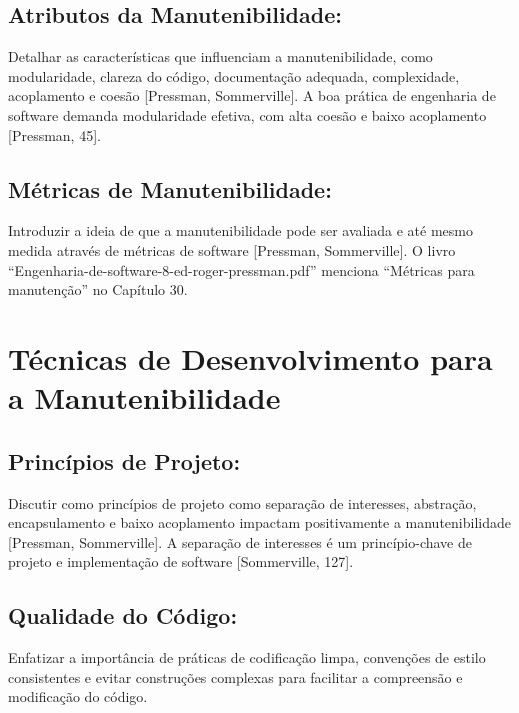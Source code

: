 \documentclass[
]{book}
\begin{document}
\subsection{Atributos da Manutenibilidade:}\label{atributos-da-manutenibilidade}

Detalhar as características que influenciam a manutenibilidade, como modularidade, clareza do código, documentação adequada, complexidade, acoplamento e coesão {[}Pressman, Sommerville{]}. A boa prática de engenharia de software demanda modularidade efetiva, com alta coesão e baixo acoplamento {[}Pressman, 45{]}.

\subsection{Métricas de Manutenibilidade:}\label{muxe9tricas-de-manutenibilidade}

Introduzir a ideia de que a manutenibilidade pode ser avaliada e até mesmo medida através de métricas de software {[}Pressman, Sommerville{]}. O livro ``Engenharia-de-software-8-ed-roger-pressman.pdf'' menciona ``Métricas para manutenção'' no Capítulo 30.

\section{Técnicas de Desenvolvimento para a Manutenibilidade}\label{tuxe9cnicas-de-desenvolvimento-para-a-manutenibilidade}

\subsection{Princípios de Projeto:}\label{princuxedpios-de-projeto}

Discutir como princípios de projeto como separação de interesses, abstração, encapsulamento e baixo acoplamento impactam positivamente a manutenibilidade {[}Pressman, Sommerville{]}. A separação de interesses é um princípio-chave de projeto e implementação de software {[}Sommerville, 127{]}.

\subsection{Qualidade do Código:}\label{qualidade-do-cuxf3digo}

Enfatizar a importância de práticas de codificação limpa, convenções de estilo consistentes e evitar construções complexas para facilitar a compreensão e modificação do código.
\end{document}
